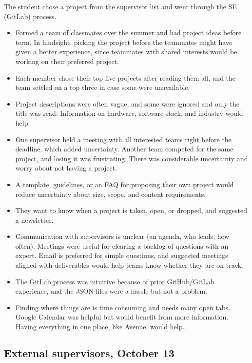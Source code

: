 \documentclass{article}
\begin{document}
    The student chose a project from the supervisor list and went through the SE (GitLab) process.
    \begin{itemize}
        \item Formed a team of classmates over the summer and had project ideas before term. In hindsight, picking
        the project before the teammates might have given a better experience, since teammates with shared
        interests would be working on their preferred project.
        \item Each member chose their top five projects after reading them all, and the team settled on a top three
        in case some were unavailable.
        \item Project descriptions were often vague, and some were ignored and only the title was read.
        Information on hardware, software stack, and industry would help.
        \item One supervisor held a meeting with all interested teams right before the deadline, which added
        uncertainty. Another team competed for the same project, and losing it was frustrating. There was
        considerable uncertainty and worry about not having a project.
        \item A template, guidelines, or an FAQ for proposing their own project would reduce uncertainty about size,
        scope, and content requirements.
        \item They want to know when a project is taken, open, or dropped, and suggested a newsletter.
        \item Communication with supervisors is unclear (an agenda, who leads, how often). Meetings were useful for
        clearing a backlog of questions with an expert. Email is preferred for simple questions, and suggested
        meetings aligned with deliverables would help teams know whether they are on track.
        \item The GitLab process was intuitive because of prior GitHub/GitLab experience, and the JSON files
        were a hassle but not a problem.
        \item Finding where things are is time consuming and needs many open tabs. Google Calendar was helpful
        but would benefit from more information. Having everything in one place, like Avenue, would help.
    \end{itemize}

    \subsection{External supervisors, October 13}
    \label{int:ES-1}
\end{document}
